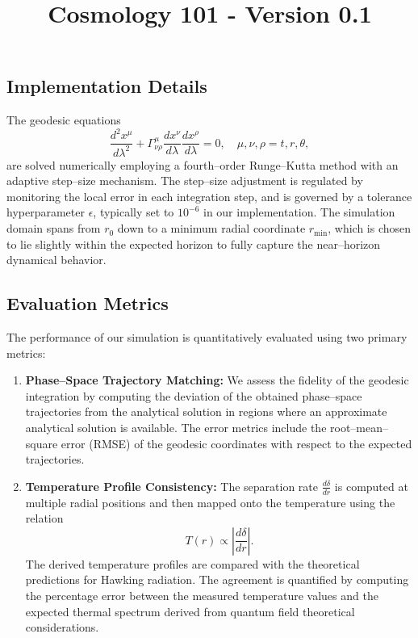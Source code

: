\documentclass{article}\usepackage{graphicx} \usepackage{amsmath} \usepackage{colortbl}\title{Cosmology 101 - Version 0.1}
\begin{document}
\subsection{Implementation Details}
The geodesic equations
\begin{equation}
\frac{d^{2}x^{\mu}}{d\lambda^{2}}+\Gamma^{\mu}_{\nu\rho}\frac{dx^{\nu}}{d\lambda}\frac{dx^{\rho}}{d\lambda}=0, \quad \mu,\nu,\rho=t, r, \theta,
\end{equation}
are solved numerically employing a fourth--order Runge--Kutta method with an adaptive step--size mechanism. The step--size adjustment is regulated by monitoring the local error in each integration step, and is governed by a tolerance hyperparameter $\epsilon$, typically set to $10^{-6}$ in our implementation. The simulation domain spans from $r_{0}$ down to a minimum radial coordinate $r_{\mathrm{min}}$, which is chosen to lie slightly within the expected horizon to fully capture the near--horizon dynamical behavior.

\subsection{Evaluation Metrics}
The performance of our simulation is quantitatively evaluated using two primary metrics:
\begin{enumerate}
    \item \textbf{Phase--Space Trajectory Matching:} We assess the fidelity of the geodesic integration by computing the deviation of the obtained phase--space trajectories from the analytical solution in regions where an approximate analytical solution is available. The error metrics include the root--mean--square error (RMSE) of the geodesic coordinates with respect to the expected trajectories.
    \item \textbf{Temperature Profile Consistency:} The separation rate $\frac{d\delta}{dr}$ is computed at multiple radial positions and then mapped onto the temperature using the relation
    \begin{equation}
    T(r) \propto \left| \frac{d\delta}{dr}\right|. 
    \end{equation}
    The derived temperature profiles are compared with the theoretical predictions for Hawking radiation. The agreement is quantified by computing the percentage error between the measured temperature values and the expected thermal spectrum derived from quantum field theoretical considerations.
\end{enumerate}
\end{document}
